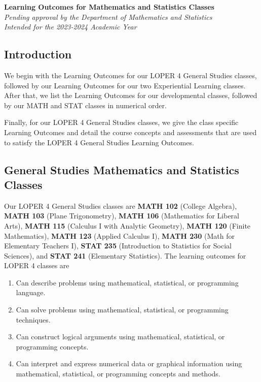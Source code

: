 \documentclass[11pt]{article}
\newenvironment{betalist}{
\begin{enumerate}[label=(\alph*),widest=zzz,leftmargin=25pt,itemsep=0pt]}
{\end{enumerate}}
\begin{document}
\begin{flushleft}
    \Large
\textbf{Learning Outcomes for Mathematics and Statistics Classes} \\
\vspace{0.25in}
\normalsize
\emph{Pending approval by the Department of Mathematics and Statistics}\\
\emph{Intended for the 2023-2024 Academic Year}
\end{flushleft}

\subsection{Introduction}

We begin with the Learning Outcomes for our LOPER 4 General Studies  
classes, followed by our Learning Outcomes for our two Experiential Learning
classes. After that, we list the Learning Outcomes for our developmental classes,
followed by our MATH and STAT classes in numerical order.


Finally, for our LOPER 4 General Studies classes, we give the class specific 
Learning Outcomes and detail the course concepts and assessments that are
used to satisfy the LOPER 4 General Studies Learning Outcomes.

\subsection{General Studies Mathematics and Statistics Classes}

Our LOPER 4 General Studies classes are 
\textbf{MATH 102} (College Algebra),
\textbf{MATH 103} (Plane Trigonometry),
\textbf{MATH 106} (Mathematics for Liberal Arts),
\textbf{MATH 115} (Calculus I with Analytic Geometry),
\textbf{MATH 120} (Finite Mathematics),
\textbf{MATH 123} (Applied Calculus I),
\textbf{MATH 230} (Math for Elementary Teachers I),
\textbf{STAT 235} (Introduction to  Statistics for  Social Sciences),
and \textbf{STAT 241}  (Elementary Statistics). The learning outcomes for LOPER  4  classes are

\begin{betalist}
\item Can describe problems using mathematical, statistical, or programming language.
\item Can solve problems using mathematical, statistical, or programming techniques.
\item Can construct logical arguments using mathematical, statistical, or programming concepts.
\item Can interpret and express numerical data or graphical information using 
   mathematical, statistical, or programming concepts and methods.
\end{betalist}
\end{document}
